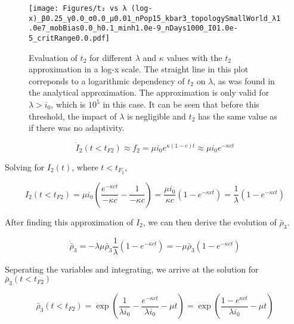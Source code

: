 \begin{figure}[!ht]
    \centering
    \texttt{[image: Figures/t₂ vs λ (log-x)\_β0.25\_γ0.0\_σ0.0\_μ0.01\_nPop15\_kbar3\_topologySmallWorld\_λ1.0e7\_mobBias0.0\_h0.1\_minh1.0e-9\_nDays1000\_I01.0e-5\_critRange0.0.pdf]}
    \caption{\small Evaluation of $t_2$ for different $\lambda$ and $\kappa$ values with the $t_2$ approximation in a log-x scale. The straight line in this plot correponds to a logarithmic dependency of $t_2$ on $\lambda$, as was found in the analytical approximation. The approximation is only valid for $\lambda > i_0$, which is $10^5$ in this case. It can be seen that before this threshold, the impact of $\lambda$ is negligible and $t_2$ has the same value as if there was no adaptivity.}
    \label{fig:t_2 vs lambda}
\end{figure}

\begin{equation}\dot I_2(t<t_{F2}) \approx f_2 = \mu i_0 e^{\kappa (1-c) t} \approx \mu i_0 e^{-\kappa c t}\end{equation}

Solving for $I_2(t)$, where $t<t_{F_2}$,

\begin{equation}I_2(t<t_{F2}) = \mu i_0 \left( \frac{e^{-\kappa c t}}{-\kappa c} - \frac{1}{-\kappa c} \right) = \frac{\mu i_0}{\kappa c}\left(1 - e^{-\kappa c t}\right) = \frac{1}{\lambda}\left(1-e^{-\kappa c t}\right) \end{equation}

After finding this approximation of $I_2$, we can then derive the evolution of $\bar \rho_3$. 

\begin{equation}\dot{\bar{\rho}}_3 = - \lambda \mu \bar{\rho}_3 \frac{1}{\lambda}\left(1 - e^{-\kappa c t}\right) =  - \mu \bar{\rho}_3\left(1 - e^{-\kappa c t}\right)\end{equation}

Seperating the variables and integrating, we arrive at the solution for $\bar \rho_3(t<t_{F2})$ 


\begin{equation}\bar \rho_3(t<t_{F2}) = \exp\left( \frac{1}{\lambda i_0} - \frac{e^{-\kappa c t}}{\lambda i_0}-\mu t\right) = \exp\left(\frac{1-e^{\kappa c t}}{\lambda i_0} - \mu t \right)\end{equation}

